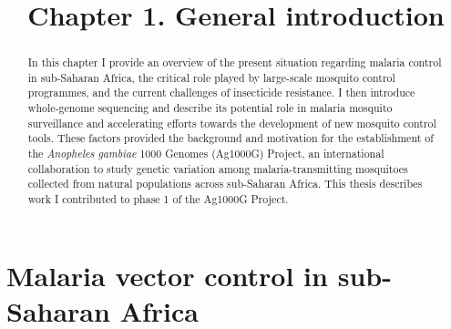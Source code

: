 \documentclass[a4paper,11pt,abstracton,hidelinks]{scrartcl}
\title{
Chapter 1. General introduction
}
\author{}
\begin{document}
\renewcommand{\abstractname}{Summary}


\maketitle


\begin{abstract}


In this chapter I provide an overview of the present situation regarding malaria control in sub-Saharan Africa, the critical role played by large-scale mosquito control programmes, and the current challenges of insecticide resistance.
%
I then introduce whole-genome sequencing and describe its potential role in malaria mosquito surveillance and accelerating efforts towards the development of new mosquito control tools.
%
These factors provided the background and motivation for the establishment of the \textit{Anopheles gambiae} 1000 Genomes (Ag1000G) Project, an international collaboration to study genetic variation among malaria-transmitting mosquitoes collected from natural populations across sub-Saharan Africa.
%
This thesis describes work I contributed to phase 1 of the Ag1000G Project.
%


\end{abstract}


\section{Malaria vector control in sub-Saharan Africa}
\end{document}
